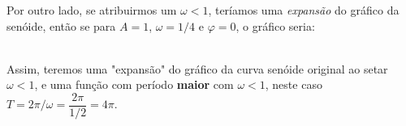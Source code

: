 Por outro lado, se atribuirmos um $\omega < 1$, teríamos uma \textit{expansão}
do gráfico da senóide, então se para $A = 1$, $\omega = 1/4$ e $\varphi = 0$,
o gráfico seria:\\
\\
Assim, teremos uma "expansão" do gráfico da curva senóide original ao setar $\omega < 1$,
e uma função com período \textbf{maior} com $\omega < 1$, neste caso 
\mbox{$T = 2\pi/\omega = \dfrac{2\pi}{1/2} = 4\pi$}.

